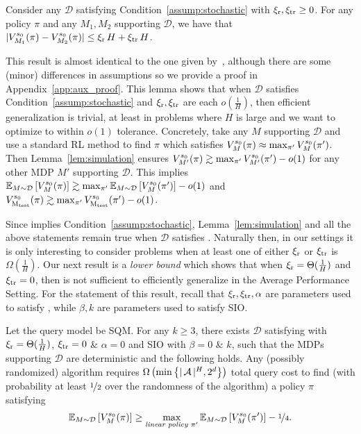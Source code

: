 \documentclass[11pt,twoside]{article}
\begin{document}
\begin{lemma}
\label{lem:simulation}
Consider any $\mathcal{D}$ satisfying Condition~\ref{assump:stochastic} with $\operatorname{\xi_r}, \operatorname{\xi_{tr}} \geq 0$. For any policy $\pi$ and any $M_1, M_2$ supporting $\mathcal{D}$, we have that $\vert V^{{s_0 }}_{{M_1 }}({\pi}) - V^{{s_0 }}_{{M_2 }}({\pi}) \vert \leq \operatorname{\xi_r} H + \operatorname{\xi_{tr}} H$.
\end{lemma}
This result is almost identical to the one given by~\citep{kakade03}, although there are some (minor) differences in assumptions so we provide a proof in Appendix~\ref{app:aux_proof}. This lemma shows that when $\mathcal{D}$ satisfies Condition~\ref{assump:stochastic} and $\operatorname{\xi_r}, \operatorname{\xi_{tr}}$ are each $o(\frac{1}{H})$, then efficient generalization is trivial, at least in problems where $H$ is large and we want to optimize to within $o(1)$ tolerance. Concretely, take any $M$ supporting $\mathcal{D}$ and use a standard RL method to find $\pi$ which satisfies $V^{{s_0 }}_{{M }}({\pi}) \approx \max_{\pi'} V^{{s_0 }}_{{M }}({\pi'})$. Then Lemma~\ref{lem:simulation} ensures $V^{{s_0 }}_{{M' }}({\pi}) \gtrsim \max_{\pi'} V^{{s_0 }}_{{M' }}({\pi'}) - o(1)$ for any other MDP $M'$ supporting $\mathcal{D}$. This implies $\operatorname{\mathbb{E}}_{M \sim \mathcal{D}} \left[ V^{{s_0 }}_{{M }}({\pi}) \right] \gtrsim \max_{\pi'} \operatorname{\mathbb{E}}_{M \sim \mathcal{D}} \left[ V^{{s_0 }}_{{M }}({\pi'}) \right] - o(1)$ and $V^{{s_0 }}_{{\operatorname{M_{test}} }}({\pi}) \gtrsim \max_{\pi'} V^{{s_0 }}_{{\operatorname{M_{test}} }}({\pi'}) - o(1)$.

Since \weakprox{} implies Condition~\ref{assump:stochastic}, Lemma~\ref{lem:simulation} and all the above statements remain true when $\mathcal{D}$ satisfies \weakprox{}. Naturally then, in our settings it is only interesting to consider problems when at least one of either $\operatorname{\xi_r}$ or $\operatorname{\xi_{tr}}$ is $\Omega(\frac{1}{H})$. Our next result is a \emph{lower bound} which shows that when $\operatorname{\xi_r} = \Theta(\frac{1}{H})$ and $\operatorname{\xi_{tr}} = 0$, then \weakprox{} is not sufficient to efficiently generalize in the Average Performance Setting. For the statement of this result, recall that $\operatorname{\xi_r}, \operatorname{\xi_{tr}}, \alpha$ are parameters used to satisfy \weakprox{}, while $\beta, k$ are parameters used to satisfy SIO.

\begin{theorem}
\label{thm:avg_per_det_lower_bound}
Let the query model be SQM. For any $k \geq 3$, there exists $\mathcal{D}$ satisfying \weakprox{} with $\operatorname{\xi_r} =\Theta(\frac{1}{H})$, $\operatorname{\xi_{tr}} = 0$ \& $\alpha = 0$ and SIO with $\beta = 0$ \& $k$, such that the MDPs supporting $\mathcal{D}$ are deterministic and the following holds. Any (possibly randomized) algorithm requires $\Omega \left( \min \left \{ \vert \operatorname{\mathcal{A}} \vert^H, 2^d \right \} \right)$ total query cost to find (with probability at least $\nicefrac{1}{2}$ over the randomness of the algorithm) a policy $\pi$ satisfying
\begin{equation*}
\operatorname{\mathbb{E}}_{M \sim \mathcal{D}} \left[ V^{{s_0 }}_{{M }}({\pi}) \right] \geq \max_{\emph{\text{linear policy }} \pi'} \operatorname{\mathbb{E}}_{M \sim \mathcal{D}} \left[ V^{{s_0 }}_{{M }}({\pi'}) \right] - \nicefrac{1}{4}.
\end{equation*}
\end{theorem}
\end{document}
